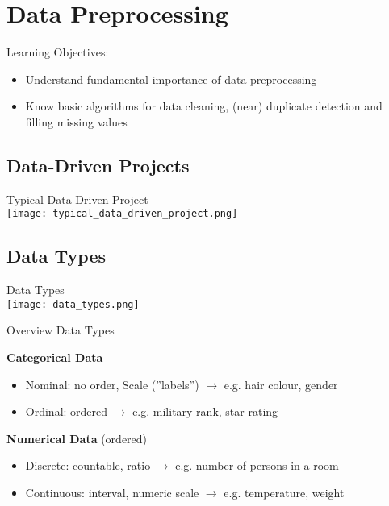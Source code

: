 \section{Data Preprocessing}

\begin{remark}
    Learning Objectives:
    \begin{itemize}
        \item Understand fundamental importance of data preprocessing
        \item Know basic algorithms for data cleaning, (near) duplicate detection and filling missing values
    \end{itemize}
\end{remark}

\subsection{Data-Driven Projects}


\begin{concept}{Typical Data Driven Project}\\
    \texttt{[image: typical\_data\_driven\_project.png]}
\end{concept}

\subsection{Data Types}

\begin{theorem}{Data Types}\\
    \texttt{[image: data\_types.png]}
\end{theorem}

\begin{concept}{Overview Data Types}

    \textbf{Categorical Data}
    \begin{itemize}
        \item Nominal: no order, Scale (''labels'') $\rightarrow$ e.g. hair colour, gender
        \item Ordinal: ordered $\rightarrow$ e.g. military rank, star rating
    \end{itemize}

    \textbf{Numerical Data} (ordered)
    \begin{itemize}
        \item Discrete: countable, ratio $\rightarrow$ e.g. number of persons in a room
        \item Continuous: interval, numeric scale $\rightarrow$ e.g. temperature, weight
    \end{itemize}
\end{concept}

